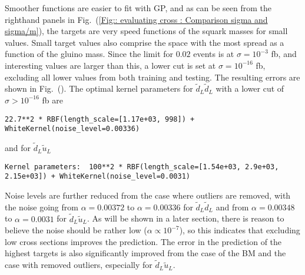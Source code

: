 \documentclass[twoside,english]{uiofysmaster}
\begin{document}
Smoother functions are easier to fit with GP, and as can be seen from the righthand panels in Fig.\ (\ref{Fig:: evaluating cross : Comparison sigma and sigma/m}), the targets are very speed functions of the squark masses for small values. Small target values also comprise the space with the most spread as a function of the gluino mass. Since the limit for $0.02$ events is at $\sigma = 10^{-3}$ fb, and interesting values are larger than this, a lower cut is set at $\sigma = 10^{-16}$ fb, excluding all lower values from both training and testing. The resulting errors are shown in Fig.\ (). The optimal kernel parameters for $\tilde{d}_L \tilde{d}_L$ with a lower cut of $\sigma > 10^{-16}$ fb are
\begin{lstlisting}
22.7**2 * RBF(length_scale=[1.17e+03, 998]) + WhiteKernel(noise_level=0.00336)
\end{lstlisting}
and for $\tilde{d}_L \tilde{u}_L$
\begin{lstlisting}
Kernel parameters:  100**2 * RBF(length_scale=[1.54e+03, 2.9e+03, 2.15e+03]) + WhiteKernel(noise_level=0.0031)
\end{lstlisting}
Noise levels are further reduced from the case where outliers are removed, with the noise going from $\alpha=0.00372$ to $\alpha = 0.00336$ for $\tilde{d}_L \tilde{d}_L$ and from $\alpha=0.00348$ to $\alpha=0.0031$ for $\tilde{d}_L \tilde{u}_L$. As will be shown in a later section, there is reason to believe the noise should be rather low ($\alpha \propto 10^{-7}$), so this indicates that excluding low cross sections improves the prediction. The error in the prediction of the highest targets is also significantly improved from the case of the BM and the case with removed outliers, especially for $\tilde{d}_L \tilde{u}_L$.
 


\end{document}
